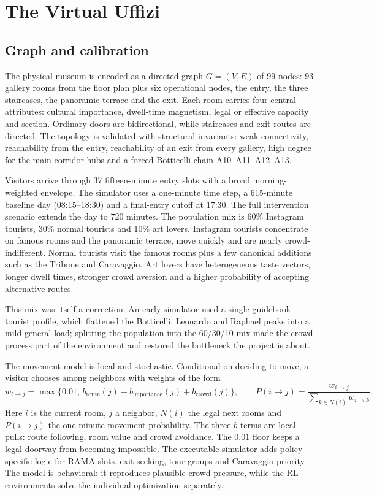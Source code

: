 \documentclass[11pt]{article}
\numberwithin{equation}{section} %
\begin{document}
\section{The Virtual Uffizi}

\subsection{Graph and calibration}

The physical museum is encoded as a directed graph $G=(V,E)$ of 99 nodes: 93 gallery rooms from the floor plan
plus six operational nodes, the entry, the three staircases, the panoramic terrace and the exit. Each room
carries four central attributes: cultural importance, dwell-time magnetism, legal or effective capacity and
section. Ordinary doors are bidirectional, while staircases and exit routes are directed. The topology is
validated with structural invariants: weak connectivity, reachability from the entry, reachability of an exit
from every gallery, high degree for the main corridor hubs and a forced Botticelli chain A10--A11--A12--A13.

Visitors arrive through 37 fifteen-minute entry slots with a broad morning-weighted envelope. The simulator
uses a one-minute time step, a 615-minute baseline day (08:15--18:30) and a final-entry cutoff at 17:30. The
full intervention scenario extends the day to 720 minutes. The population mix is 60\% Instagram tourists, 30\%
normal tourists and 10\% art lovers. Instagram tourists concentrate on famous rooms and the panoramic terrace,
move quickly and are nearly crowd-indifferent. Normal tourists visit the famous rooms plus a few canonical
additions such as the Tribune and Caravaggio. Art lovers have heterogeneous taste vectors, longer dwell times,
stronger crowd aversion and a higher probability of accepting alternative routes.

This mix was itself a correction. An early simulator used a single guidebook-tourist profile, which flattened
the Botticelli, Leonardo and Raphael peaks into a mild general load; splitting the population into the
60/30/10 mix made the crowd process part of the environment and restored the bottleneck the project is about.

The movement model is local and stochastic. Conditional on deciding to move, a visitor chooses among neighbors
with weights of the form
\begin{equation}
w_{i\to j}=\max\{0.01,\, b_{\text{route}}(j)+b_{\text{importance}}(j)+b_{\text{crowd}}(j)\},
\qquad
P(i\to j)=\frac{w_{i\to j}}{\sum_{k\in N(i)} w_{i\to k}}.
\label{eq:move}
\end{equation}
Here $i$ is the current room, $j$ a neighbor, $N(i)$ the legal next rooms and $P(i\to j)$ the one-minute
movement probability. The three $b$ terms are local pulls: route following, room value and crowd avoidance.
The $0.01$ floor keeps a legal doorway from becoming impossible. The executable simulator adds policy-specific
logic for RAMA slots, exit seeking, tour groups and Caravaggio priority. The model is behavioral: it
reproduces plausible crowd pressure, while the RL environments solve the individual optimization separately.
\end{document}

